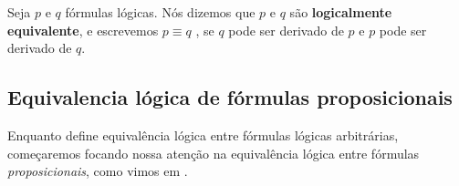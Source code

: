 \begin{definition}
\label{defLogicalEquivalence}
Seja $p$ e $q$ fórmulas lógicas. Nós dizemos que $p$ e $q$ são \textbf{logicalmente equivalente}, e escrevemos $p \equiv q$ , se $q$ pode ser derivado de $p$ e $p$ pode ser derivado de $q$.
\end{definition}

\subsection*{Equivalencia lógica de fórmulas proposicionais}

Enquanto  define equivalência lógica entre fórmulas lógicas arbitrárias, começaremos focando nossa atenção na equivalência lógica entre fórmulas \textit{proposicionais}, como vimos em .

